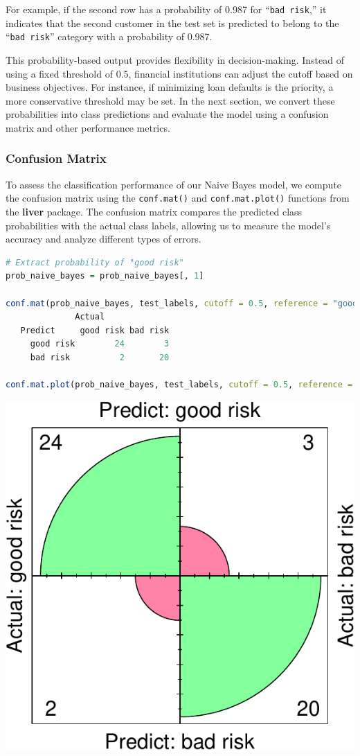 \documentclass[
]{book}
\newcommand{\passthrough}[1]{#1}
\theoremstyle{definition}
\theoremstyle{definition}
\theoremstyle{definition}
\theoremstyle{definition}
\theoremstyle{remark}
\begin{document}
For example, if the second row has a probability of 0.987 for ``\passthrough{\lstinline!bad risk!},'' it indicates that the second customer in the test set is predicted to belong to the ``\passthrough{\lstinline!bad risk!}'' category with a probability of 0.987.

This probability-based output provides flexibility in decision-making. Instead of using a fixed threshold of 0.5, financial institutions can adjust the cutoff based on business objectives. For instance, if minimizing loan defaults is the priority, a more conservative threshold may be set. In the next section, we convert these probabilities into class predictions and evaluate the model using a confusion matrix and other performance metrics.

\subsubsection*{Confusion Matrix}\label{confusion-matrix-1}

To assess the classification performance of our Naive Bayes model, we compute the confusion matrix using the \passthrough{\lstinline!conf.mat()!} and \passthrough{\lstinline!conf.mat.plot()!} functions from the \textbf{liver} package. The confusion matrix compares the predicted class probabilities with the actual class labels, allowing us to measure the model's accuracy and analyze different types of errors.

\begin{lstlisting}[language=R]
# Extract probability of "good risk"
prob_naive_bayes = prob_naive_bayes[, 1] 

conf.mat(prob_naive_bayes, test_labels, cutoff = 0.5, reference = "good risk")
              Actual
   Predict     good risk bad risk
     good risk        24        3
     bad risk          2       20

conf.mat.plot(prob_naive_bayes, test_labels, cutoff = 0.5, reference = "good risk")
\end{lstlisting}

\begin{center}\includegraphics[width=0.65\linewidth]{bayes_files/figure-latex/unnamed-chunk-16-1} \end{center}
\end{document}
